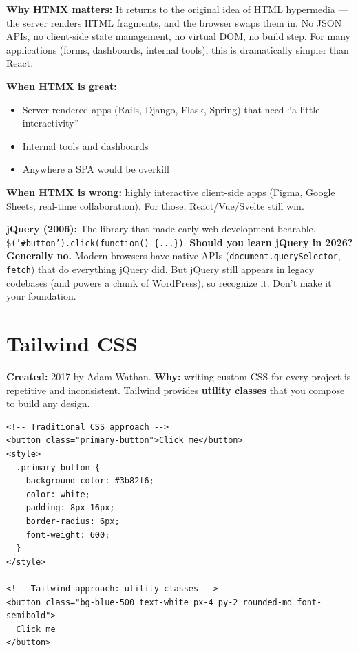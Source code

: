 \documentclass[11pt, letterpaper]{article}
\begin{document}
\textbf{Why HTMX matters:} It returns to the original idea of HTML hypermedia --- the server renders HTML fragments, and the browser swaps them in. No JSON APIs, no client-side state management, no virtual DOM, no build step. For many applications (forms, dashboards, internal tools), this is dramatically simpler than React.

\textbf{When HTMX is great:}
\begin{itemize}[noitemsep]
  \item Server-rendered apps (Rails, Django, Flask, Spring) that need ``a little interactivity''
  \item Internal tools and dashboards
  \item Anywhere a SPA would be overkill
\end{itemize}

\textbf{When HTMX is wrong:} highly interactive client-side apps (Figma, Google Sheets, real-time collaboration). For those, React/Vue/Svelte still win.

\textbf{jQuery (2006):} The library that made early web development bearable. \texttt{\$('\#button').click(function() \{...\})}. \textbf{Should you learn jQuery in 2026?} \textbf{Generally no.} Modern browsers have native APIs (\texttt{document.querySelector}, \texttt{fetch}) that do everything jQuery did. But jQuery still appears in legacy codebases (and powers a chunk of WordPress), so recognize it. Don't make it your foundation.

\section*{Tailwind CSS}

\textbf{Created:} 2017 by Adam Wathan. \textbf{Why:} writing custom CSS for every project is repetitive and inconsistent. Tailwind provides \textbf{utility classes} that you compose to build any design.

\begin{lstlisting}[style=code, caption={Traditional CSS vs Tailwind}]
<!-- Traditional CSS approach -->
<button class="primary-button">Click me</button>
<style>
  .primary-button {
    background-color: #3b82f6;
    color: white;
    padding: 8px 16px;
    border-radius: 6px;
    font-weight: 600;
  }
</style>

<!-- Tailwind approach: utility classes -->
<button class="bg-blue-500 text-white px-4 py-2 rounded-md font-semibold">
  Click me
</button>
\end{lstlisting}
\end{document}
